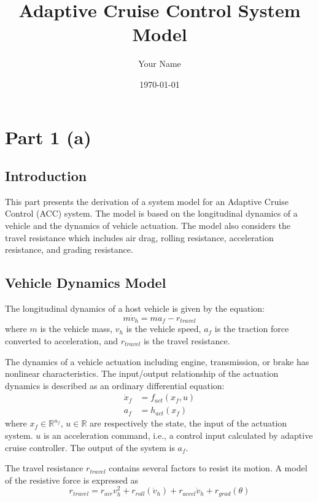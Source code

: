 \documentclass{report}
\begin{document}
\title{Adaptive Cruise Control System Model}
\author{Your Name}
\date{\today}

\maketitle

\tableofcontents{}

\chapter{Part 1 (a)}
\section{Introduction}
This part presents the derivation of a system model for an Adaptive Cruise Control (ACC) system. The model is based on the longitudinal dynamics of a vehicle and the dynamics of vehicle actuation. The model also considers the travel resistance which includes air drag, rolling resistance, acceleration resistance, and grading resistance.

\section{Vehicle Dynamics Model}
The longitudinal dynamics of a host vehicle is given by the equation:
\begin{equation}
    m\dot{v}_h = m a_f - r_{travel}
\end{equation}
where \(m\) is the vehicle mass, \(v_h\) is the vehicle speed, \(a_f\) is the traction force converted to acceleration, and \(r_{travel}\) is the travel resistance.

The dynamics of a vehicle actuation including engine, transmission, or brake has nonlinear characteristics. The input/output relationship of the actuation dynamics is described as an ordinary differential equation:
\begin{align}
    \dot{x}_f & = f_{act}(x_f, u) \\
    a_f       & = h_{act}(x_f)
\end{align}
where \(x_f \in \mathbb{R}^{n_f}\), \(u \in \mathbb{R}\) are respectively the state, the input of the actuation system. \(u\) is an acceleration command, i.e., a control input calculated by adaptive cruise controller. The output of the system is \(a_f\).

The travel resistance \(r_{travel}\) contains several factors to resist its motion. A model of the resistive force is expressed as
\begin{equation}
    r_{travel} = r_{air} v_h^2 + r_{roll}(\dot{v}_h) + r_{accel} \dot{v}_h + r_{grad}(\theta)
\end{equation}
\end{document}
